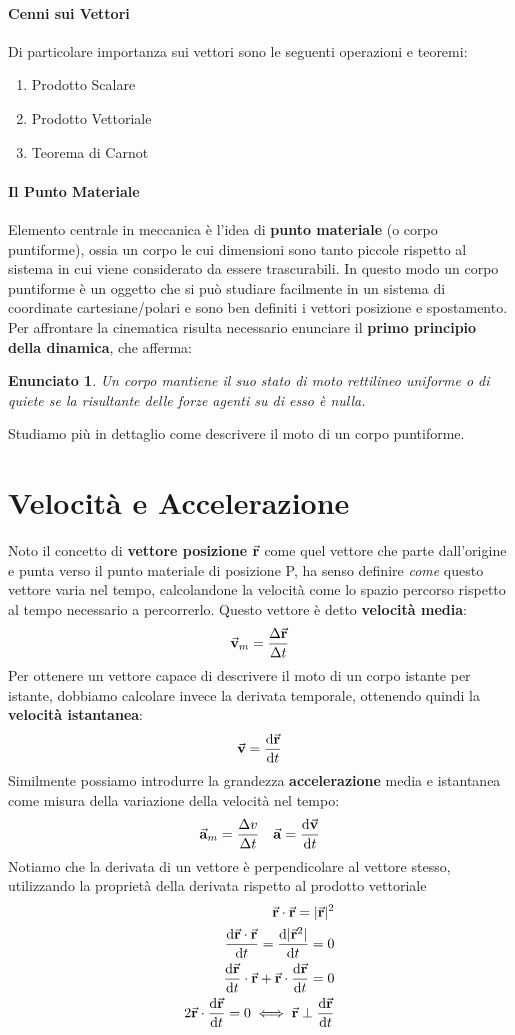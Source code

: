 \documentclass{report}
\newtheorem{enunc}[defn]{Enunciato}
\renewcommand{\a}{\va{a}}
\renewcommand{\v}{\va{v}}
\renewcommand{\r}{\va{r}}
\begin{document}
\paragraph{Cenni sui Vettori}
Di particolare importanza sui vettori sono le seguenti operazioni e teoremi:
\begin{enumerate}
    \item Prodotto Scalare
    \item Prodotto Vettoriale
    \item Teorema di Carnot
\end{enumerate}
\paragraph{Il Punto Materiale}
Elemento centrale in meccanica è l'idea di \textbf{punto materiale} (o corpo puntiforme), ossia un corpo le cui dimensioni sono tanto piccole rispetto al sistema in cui viene considerato da essere trascurabili. In questo modo un corpo puntiforme è un oggetto che si può studiare facilmente in un sistema di coordinate cartesiane/polari e sono ben definiti i vettori posizione e spostamento.\\
Per affrontare la cinematica risulta necessario enunciare il \textbf{primo principio della dinamica}, che afferma:
\begin{enunc}
Un corpo mantiene il suo stato di moto rettilineo uniforme o di quiete se la risultante delle forze agenti su di esso è nulla. 
\end{enunc}
Studiamo più in dettaglio come descrivere il moto di un corpo puntiforme.
\section{Velocità e Accelerazione}
Noto il concetto di \textbf{vettore posizione} $\r$ come quel vettore che parte dall'origine e punta verso il punto materiale di posizione P, ha senso definire \textit{come} questo vettore varia nel tempo, calcolandone la velocità come lo spazio percorso rispetto al tempo necessario a percorrerlo. Questo vettore è detto \textbf{velocità media}:
\[\v_m=\frac{\Delta \r}{\Delta t}\]
Per ottenere un vettore capace di descrivere il moto di un corpo istante per istante, dobbiamo calcolare invece la derivata temporale, ottenendo quindi la \textbf{velocità istantanea}:
\[\v=\dv{\r}{t}\]
Similmente possiamo introdurre la grandezza \textbf{accelerazione} media e istantanea come misura della variazione della velocità nel tempo:
\[\a_m=\frac{\Delta v}{\Delta t}\quad\a=\dv{\v}{t}\]
Notiamo che la derivata di un vettore è perpendicolare al vettore stesso, utilizzando la proprietà della derivata rispetto al prodotto vettoriale
\begin{align*}
    \r\cdot\r=|\r|^2\\
    \dv{\r\cdot\r}{t}=\dv{|\r^2|}{t}=0\\
    \dv{\r}{t}\cdot\r+\r\cdot\dv{\r}{t}=0\\
    2\r\cdot\dv{\r}{t}=0\iff\r\perp\dv{\r}{t}
\end{align*}
\end{document}

